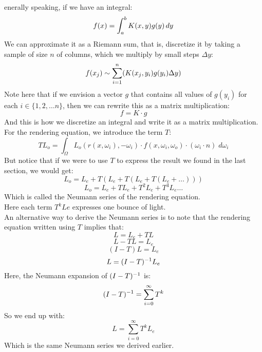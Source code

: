 \documentclass[12pt]{article}
\begin{document}
enerally speaking, if we have an integral:
\[ f(x) = \int_{a}^{b} K(x, y)g(y) \, dy \]
We can approximate it as a Riemann sum,
that is, discretize it
by taking a sample of size $n$ of columns,
which we multiply by small steps $\Delta y$:
\[ f(x_j) \sim \sum_{i = 1}^{n} (K(x_j, y_i)g(y_i) \Delta y) \]
Note here that if we envision
a vector $g$ that contains all values of $g(y_i)$
for each $i \in \{1, 2, \dots n\}$,
then we can rewrite this as a matrix multiplication:
\[ f = K \cdot g \]
And this is how we discretize an integral and write
it as a matrix multiplication. \\

For the rendering equation, we introduce the term $T$:
\[ TL_o =  \int_\Omega L_o(r(x, \omega_i), -\omega_i)  \cdot
f(x, \omega_i, \omega_o) \cdot
(\omega_i \cdot n) \; d\omega_i \]
But notice that if we were to use $T$
to express the result we found in the last section, we
would get:
\[ L_o = L_e + T( L_e + T( L_e + T (L_e + \dots))) \]
\[ L_o = L_e + TL_e + T^2L_e + T^3L_e \dots \]
Which is called the Neumann series of the rendering equation. \\

Here each term $T^kLe$ expresses one bounce of light. \\

An alternative way to derive the Neumann series
is to note that the rendering equation written using $T$
implies that:
\[ L = L_e + TL \]
\[ L - TL = L_e \]
\[ (I - T)L = L_e \]
\[ L = (I-T)^{-1} L_e \]
Here, the Neumann expansion of $(I-T)^{-1}$ is:
\[ (I-T)^{-1} = \sum_{i=0}^\infty T^k \]
So we end up with:
\[ L = \sum_{i=0}^\infty T^kL_e \]
Which is the same Neumann series we derived earlier. \\
\end{document}
